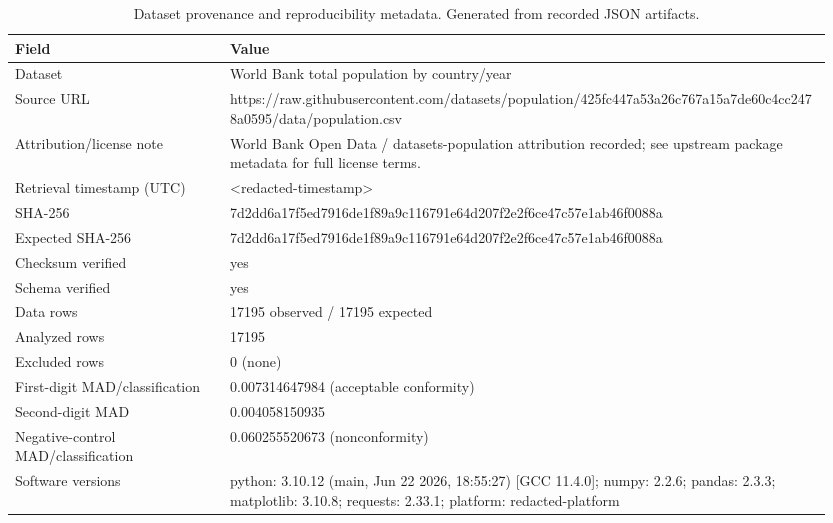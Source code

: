 \begin{table}[t]
\centering
\caption{Dataset provenance and reproducibility metadata. Generated from recorded JSON artifacts.}
\label{tab:provenance-appendix}
\begin{tabular}{p{0.25\linewidth}p{0.70\linewidth}}
\toprule
Field & Value \\
\midrule
Dataset & World Bank total population by country/year \\
Source URL & https://raw.githubusercontent.com/datasets/population/425fc447a53a26c767a15a7de60c4cc2478a0595/data/population.csv \\
Attribution/license note & World Bank Open Data / datasets-population attribution recorded; see upstream package metadata for full license terms. \\
Retrieval timestamp (UTC) & <redacted-timestamp> \\
SHA-256 & 7d2dd6a17f5ed7916de1f89a9c116791e64d207f2e2f6ce47c57e1ab46f0088a \\
Expected SHA-256 & 7d2dd6a17f5ed7916de1f89a9c116791e64d207f2e2f6ce47c57e1ab46f0088a \\
Checksum verified & yes \\
Schema verified & yes \\
Data rows & 17195 observed / 17195 expected \\
Analyzed rows & 17195 \\
Excluded rows & 0 (none) \\
First-digit MAD/classification & 0.007314647984 (acceptable conformity) \\
Second-digit MAD & 0.004058150935 \\
Negative-control MAD/classification & 0.060255520673 (nonconformity) \\
Software versions & python: 3.10.12 (main, Jun 22 2026, 18:55:27) [GCC 11.4.0]; numpy: 2.2.6; pandas: 2.3.3; matplotlib: 3.10.8; requests: 2.33.1; platform: redacted-platform \\
\bottomrule
\end{tabular}
\end{table}

